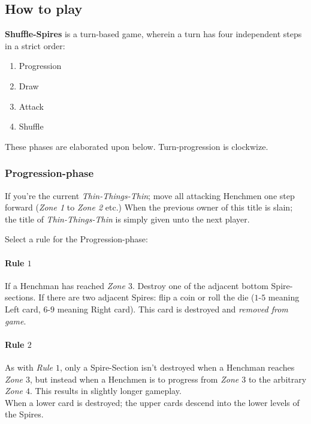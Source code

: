 
\subsection{How to play}
\label{sec:howtoplay}
\textbf{Shuffle-Spires} is a turn-based game, wherein a turn has four independent steps in a strict order:
\begin{enumerate}[noitemsep]
	\item Progression
	\item Draw
	\item Attack
	\item Shuffle
\end{enumerate}
These phases are elaborated upon below.
Turn-progression is clockwize.

\subsubsection{Progression-phase}
\label{sec:playingshufflespires_progressionphase}
If you’re the current \textit{Thin-Things-Thin}; move all attacking Henchmen one step forward (\textit{Zone 1} to \textit{Zone 2} etc.)
When the previous owner of this title is slain; the title of \textit{Thin-Things-Thin} is simply given unto the next player.

Select a rule for the Progression-phase:

\paragraph{Rule $1$}
If a Henchman has reached \textit{Zone $3$}. Destroy one of the adjacent bottom Spire-sections.
If there are two adjacent Spires: flip a coin or roll the die ($1$-$5$ meaning Left card, $6$-$9$ meaning Right card).
This card is destroyed and \textit{removed from game}.

\paragraph{Rule $2$}
As with \textit{Rule $1$}, only a Spire-Section isn’t destroyed when a Henchman reaches \textit{Zone $3$}, but instead when a Henchmen is to progress from \textit{Zone $3$} to the arbitrary \textit{Zone $4$}.
This results in slightly longer gameplay.\\

\noindent
When a lower card is destroyed; the upper cards descend into the lower levels of the Spires.

